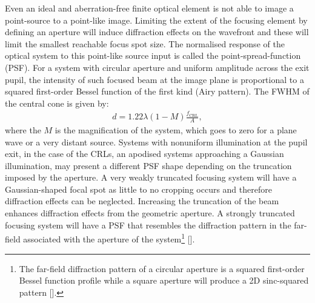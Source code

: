 \begin{refsection}
Even an ideal and aberration-free finite optical element is not able to image a point-source to a point-like image. Limiting the extent of the focusing element by defining an aperture will induce diffraction effects on the wavefront and these will limit the smallest reachable focus spot size. The normalised response of the optical system to this point-like source input is called the point-spread-function (PSF). For a system with circular aperture and uniform amplitude across the exit pupil, the intensity of such focused beam at the image plane is proportional to a squared first-order Bessel function of the first kind (Airy pattern). The FWHM of the central cone is given by:
\begin{align}\label{eq:PSF}
    d = 1.22\lambda (1-M)\frac{f_{\text{CRL}}}{A},
\end{align}{}
where the $M$ is the magnification of the system, which goes to zero for a plane wave or a very distant source. Systems with nonuniform illumination at the pupil exit, in the case of the CRLs, an apodised systems approaching a Gaussian illumination, may present a different PSF shape depending on the truncation imposed by the aperture. A very weakly truncated focusing system will have a Gaussian-shaped focal spot as little to no cropping occurs and therefore diffraction effects can be neglected. Increasing the truncation of the beam enhances diffraction effects from the geometric aperture. A strongly truncated focusing system will have a PSF that resembles the diffraction pattern in the far-field associated with the aperture of the system\footnote{The far-field diffraction pattern of a circular aperture is a squared first-order Bessel function profile while a square aperture will produce a 2D sinc-squared pattern [\cite{Guasti1993}].} [\cite{Mahajan1986}]. 



\end{refsection}
